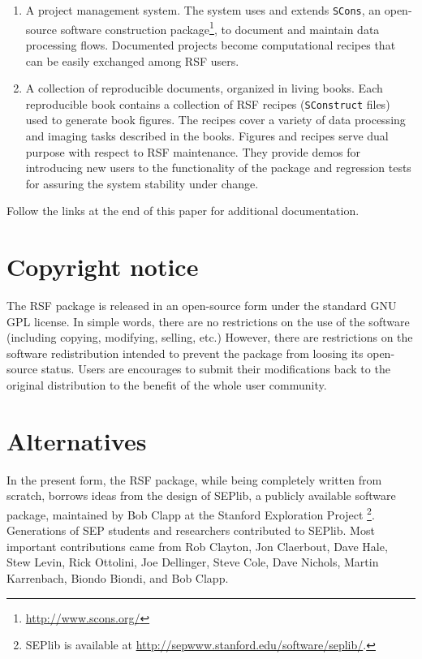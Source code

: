 \begin{enumerate}
\item A project management system. The system uses and extends \texttt{SCons},
  an open-source software construction
  package\footnote{\url{http://www.scons.org/}}, to document and maintain data
  processing flows. Documented projects become computational recipes that can
  be easily exchanged among RSF users.
  
\item A collection of reproducible documents, organized in living books. Each
  reproducible book contains a collection of RSF recipes (\texttt{SConstruct}
  files) used to generate book figures. The recipes cover a variety of data
  processing and imaging tasks described in the books. Figures and recipes
  serve dual purpose with respect to RSF maintenance. They provide demos for
  introducing new users to the functionality of the package and regression
  tests for assuring the system stability under change.

\end{enumerate}

Follow the links at the end of this paper for additional documentation.

\section{Copyright notice}

The RSF package is released in an open-source form under the standard GNU GPL
license. In simple words, there are no restrictions on the use of the software
(including copying, modifying, selling, etc.) However, there are restrictions
on the software redistribution intended to prevent the package from loosing
its open-source status. Users are encourages to submit their modifications
back to the original distribution to the benefit of the whole user community.

\section{Alternatives} 

In the present form, the RSF package, while being completely written
from scratch, borrows ideas from the design of SEPlib, a publicly
available software package, maintained by Bob Clapp at the Stanford
Exploration Project
\cite[]{Claerbout.sep.70.413,Dellinger.sep.73.461,Nichols.sep.82.257,Biondi.sep.92.343,Clapp.sep.102.bob1}\footnote{SEPlib
is available at \url{http://sepwww.stanford.edu/software/seplib/}.}.
Generations of SEP students and researchers contributed to
SEPlib. Most important contributions came from Rob Clayton, Jon
Claerbout, Dave Hale, Stew Levin, Rick Ottolini, Joe Dellinger, Steve
Cole, Dave Nichols, Martin Karrenbach, Biondo Biondi, and Bob Clapp.

